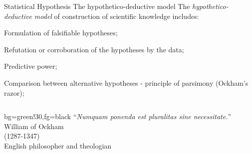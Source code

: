\documentclass[t]{beamer}
\begin{document}

\begin{ftst}
{Statistical Hypothesis}
{The hypothetico-deductive model}
The \textit{hypothetico-deductive model} of construction of scientific knowledge includes:

\bitems Formulation of falsifiable hypotheses;
	\item Refutation or corroboration of the hypotheses by the data;
	\item Predictive power;
	\item Comparison between alternative hypotheses - principle of parsimony (Ockham's razor);
\eitem

\begin{columns}[T]
    \vhalf
	\begin{colorblock}{}{bg=green!30,fg=black}
	``\textit{Numquam ponenda est pluralitas sine necessitate.}''\\
	\flushright\vspace{-1em}\small William of Ockham\\
	\flushright\vspace{-1em}\small (1287-1347)\\
	\flushright\vspace{-1em}\small English philosopher and theologian\\
	\end{colorblock}
\end{columns}
\end{ftst}
\end{document}
